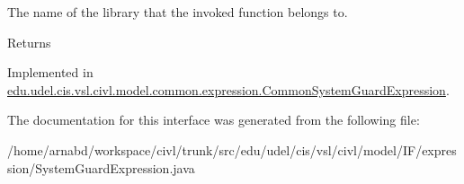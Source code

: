 The name of the library that the invoked function belongs to. 

\begin{DoxyReturn}{Returns}

\end{DoxyReturn}


Implemented in \hyperlink{classedu_1_1udel_1_1cis_1_1vsl_1_1civl_1_1model_1_1common_1_1expression_1_1CommonSystemGuardExpression_a6cf4df088f3f1aec840e5cd470249659}{edu.\+udel.\+cis.\+vsl.\+civl.\+model.\+common.\+expression.\+Common\+System\+Guard\+Expression}.



The documentation for this interface was generated from the following file\+:\begin{DoxyCompactItemize}
\item 
/home/arnabd/workspace/civl/trunk/src/edu/udel/cis/vsl/civl/model/\+I\+F/expression/System\+Guard\+Expression.\+java\end{DoxyCompactItemize}
